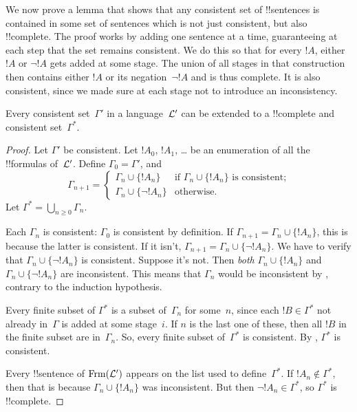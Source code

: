 \documentclass[../../../include/open-logic-section]{subfiles}
\begin{document}

\begin{explain}
We now prove a lemma that shows that any consistent set of
!!{sentence}s is contained in some set of sentences which is not just
consistent, but also !!{complete}. The proof works by adding one
sentence at a time, guaranteeing at each step that the set remains
consistent. We do this so that for every $!A$, either $!A$ or $\lnot
!A$ gets added at some stage. The union of all stages in that
construction then contains either $!A$ or its negation~$\lnot !A$ and
is thus complete. It is also consistent, since we made sure at each
stage not to introduce an inconsistency.
\end{explain}

\begin{lem}
 Every consistent set~$\Gamma'$ in a
language~$\mathcal L'$ can be extended to a !!{complete} and consistent
set~$\Gamma^*$.
\end{lem}

\begin{proof}
Let $\Gamma'$ be consistent.  Let $!A_0$, $!A_1$, \dots{}
be an enumeration of all the !!{formula}s of~$\mathcal L'$.  Define
$\Gamma_0 = \Gamma'$, and
\[
\Gamma_{n+1} =
\begin{cases}
\Gamma_n \cup \{ !A_n \} & \textrm{if $\Gamma_n \cup \{!A_n\}$ is
  consistent;} \\
\Gamma_n \cup \{ \lnot !A_n \} & \textrm{otherwise.}
\end{cases}
\]
Let $\Gamma^* = \bigcup_{n \geq 0} \Gamma_n$.

Each $\Gamma_n$ is consistent: $\Gamma_0$ is consistent by definition.
If $\Gamma_{n+1} = \Gamma_n \cup \{!A_n\}$, this is because the latter
is consistent.  If it isn't, $\Gamma_{n+1} = \Gamma_n \cup \{\lnot
!A_n\}$. We have to verify that $\Gamma_n \cup \{\lnot !A_n\}$ is
consistent. Suppose it's not. Then \emph{both} $\Gamma_n \cup
\{!A_n\}$ and $\Gamma_n \cup \{\lnot !A_n\}$ are inconsistent.  This
means that $\Gamma_n$ would be inconsistent by
,
contrary to the induction hypothesis.

Every finite subset of $\Gamma^*$ is a subset of~$\Gamma_n$ for
some~$n$, since each $!B \in \Gamma^*$ not already in~$\Gamma$ is
added at some stage~$i$. If $n$ is the last one of these, then all
$!B$ in the finite subset are in~$\Gamma_n$. So, every finite subset
of~$\Gamma^*$ is consistent. By
,
$\Gamma^*$ is consistent.

Every !!{sentence} of $\Frm[L']$ appears on the list used to
define~$\Gamma^*$. If $!A_n \notin \Gamma^*$, then that is because
$\Gamma_n \cup \{!A_n\}$ was inconsistent.  But then $\lnot !A_n
\in \Gamma^*$, so $\Gamma^*$ is !!{complete}.
\end{proof}
\end{document}
